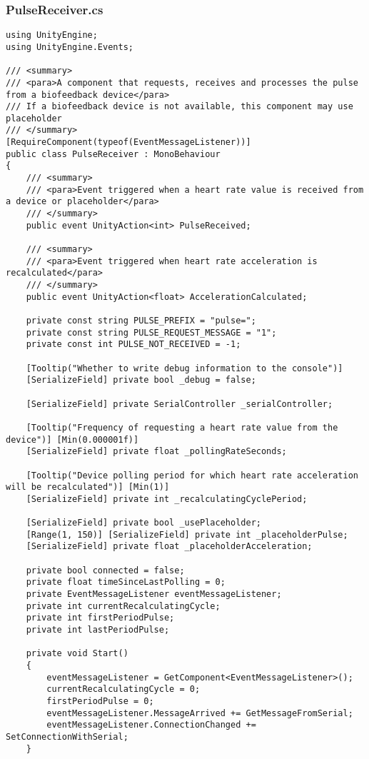\subsubsection*{PulseReceiver.cs}
\begin{verbatim}
using UnityEngine;
using UnityEngine.Events;

/// <summary>
/// <para>A component that requests, receives and processes the pulse from a biofeedback device</para>
/// If a biofeedback device is not available, this component may use placeholder
/// </summary>
[RequireComponent(typeof(EventMessageListener))]
public class PulseReceiver : MonoBehaviour
{
    /// <summary>
    /// <para>Event triggered when a heart rate value is received from a device or placeholder</para>
    /// </summary>
    public event UnityAction<int> PulseReceived;

    /// <summary>
    /// <para>Event triggered when heart rate acceleration is recalculated</para>
    /// </summary>
    public event UnityAction<float> AccelerationCalculated;

    private const string PULSE_PREFIX = "pulse=";
    private const string PULSE_REQUEST_MESSAGE = "1";
    private const int PULSE_NOT_RECEIVED = -1;

    [Tooltip("Whether to write debug information to the console")] 
    [SerializeField] private bool _debug = false;

    [SerializeField] private SerialController _serialController;

    [Tooltip("Frequency of requesting a heart rate value from the device")] [Min(0.000001f)] 
    [SerializeField] private float _pollingRateSeconds;

    [Tooltip("Device polling period for which heart rate acceleration will be recalculated")] [Min(1)] 
    [SerializeField] private int _recalculatingCyclePeriod;

    [SerializeField] private bool _usePlaceholder;
    [Range(1, 150)] [SerializeField] private int _placeholderPulse;
    [SerializeField] private float _placeholderAcceleration;

    private bool connected = false;
    private float timeSinceLastPolling = 0;
    private EventMessageListener eventMessageListener;
    private int currentRecalculatingCycle;
    private int firstPeriodPulse;
    private int lastPeriodPulse;

    private void Start()
    {
        eventMessageListener = GetComponent<EventMessageListener>();
        currentRecalculatingCycle = 0;
        firstPeriodPulse = 0;
        eventMessageListener.MessageArrived += GetMessageFromSerial;
        eventMessageListener.ConnectionChanged += SetConnectionWithSerial;
    }


\end{verbatim}
